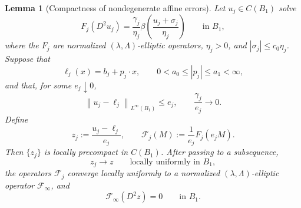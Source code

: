 \documentclass[11pt,letterpaper]{amsart}
\numberwithin{equation}{section}
\newcommand{\norm}[1]{\left\lVert #1\right\rVert}
\newtheorem{lemma}[theorem]{Lemma}
\theoremstyle{definition}
\theoremstyle{remark}
\begin{document}
\begin{lemma}[Compactness of nondegenerate affine errors]
\label{lem:nondegenerate-error-compactness}
Let $u_j\in C(B_1)$ solve
\begin{equation}\label{eq:nondegenerate-error-equation}
F_j(D^2u_j)
=
\frac{\gamma_j}{\eta_j}
\beta\left(\frac{u_j+\sigma_j}{\eta_j}\right)
\qquad\text{in }B_1,
\end{equation}
where the $F_j$ are normalized $(\lambda,\Lambda)$-elliptic operators,
$\eta_j>0$, and $|\sigma_j|\leq c_0\eta_j$. Suppose that
$$
\ell_j(x)=b_j+p_j\cdot x,
\qquad
0<a_0\leq|p_j|\leq a_1<\infty,
$$
and that, for some $e_j\downarrow0$,
\begin{equation}\label{eq:nondegenerate-error-assumptions}
\norm{u_j-\ell_j}_{L^\infty(B_1)}\leq e_j,
\qquad
\frac{\gamma_j}{e_j}\longrightarrow0.
\end{equation}
Define
$$
z_j:=\frac{u_j-\ell_j}{e_j},
\qquad
\mathcal F_j(M):=\frac1{e_j}F_j(e_jM).
$$
Then $\{z_j\}$ is locally precompact in $C(B_1)$. After passing to a
subsequence,
$$
z_j\longrightarrow z
\qquad\text{locally uniformly in }B_1,
$$
the operators $\mathcal F_j$ converge locally uniformly to a normalized
$(\lambda,\Lambda)$-elliptic operator $\mathcal F_\infty$, and
\begin{equation}\label{eq:nondegenerate-error-limit}
\mathcal F_\infty(D^2z)=0
\qquad\text{in }B_1.
\end{equation}
\end{lemma}
\end{document}
